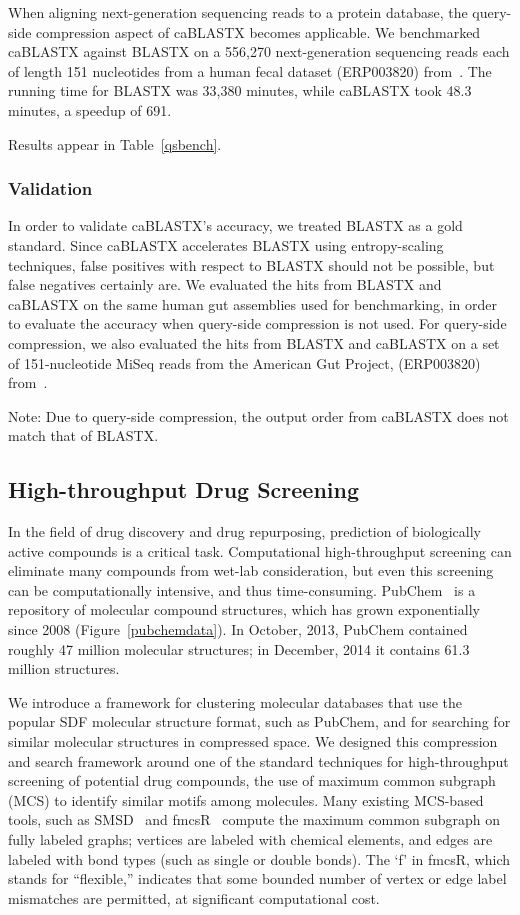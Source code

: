 \documentclass[review,preprint,12pt]{elsarticle}
\renewcommand{\cite}{\citep} %
\theoremstyle{definition}
\theoremstyle{remark}
\numberwithin{equation}{section}
\begin{document}
When aligning next-generation sequencing reads to a protein database, the
query-side compression aspect of caBLASTX becomes applicable.
We benchmarked caBLASTX against BLASTX on a 556,270
next-generation sequencing reads each of length 151 nucleotides from a human 
fecal dataset (ERP003820) from~\cite{blah}.
The running time for BLASTX was 33,380 minutes, while caBLASTX took 48.3 
minutes, a speedup of 691.
 
Results appear in Table~\ref{qsbench}.




\subsubsection{Validation}

In order to validate caBLASTX's accuracy, we treated BLASTX as a gold standard. 
Since caBLASTX accelerates BLASTX
using entropy-scaling techniques, false positives with respect to BLASTX should 
not be possible, but false negatives certainly are.
We evaluated the hits from BLASTX and caBLASTX on the same human gut
assemblies used for benchmarking, in order to evaluate the accuracy when
query-side compression is not used.
For query-side compression, we also evaluated the hits from BLASTX and caBLASTX
on a set of 151-nucleotide MiSeq reads from the American Gut Project,
(ERP003820) from~\cite{blah}.

Note: Due to query-side compression, the output order from caBLASTX does not
match that of BLASTX.

\subsection{High-throughput Drug Screening}

In the field of drug discovery and drug repurposing, prediction of biologically 
active compounds is a critical task. 
Computational high-throughput screening can eliminate many compounds from 
wet-lab consideration, but even this screening can be computationally 
intensive, and thus time-consuming.
PubChem~\cite{Bolton:2008} is a repository of molecular compound structures, 
which has grown exponentially since 2008 (Figure~\ref{pubchemdata}). 
In October, 2013, PubChem contained roughly 47 million molecular structures; 
in December, 2014 it contains 61.3 million structures.

We introduce a framework for clustering molecular databases that use the 
popular SDF molecular structure format, such as PubChem, and for searching for 
similar molecular structures in compressed space.
We designed this compression and search framework around one of the standard 
techniques for high-throughput screening of potential drug compounds, the use 
of maximum common subgraph (MCS) to identify similar motifs among molecules.
Many existing MCS-based tools, such as SMSD~\cite{thornton} and 
fmcsR~\cite{girke} compute the maximum common subgraph on fully labeled graphs; 
vertices are labeled with chemical elements, and edges are labeled with bond 
types (such as single or double bonds).
The `f' in fmcsR, which stands for ``flexible,'' indicates that some bounded 
number of vertex or edge label mismatches are permitted, at significant 
computational cost.
\end{document}
